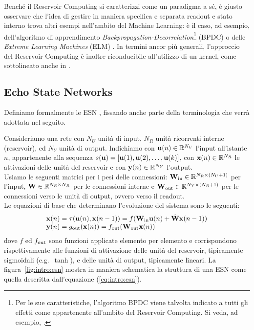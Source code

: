 Benché il Reservoir Computing si caratterizzi come un paradigma a sé, è giusto osservare che l'idea di gestire in maniera specifica e separata readout e stato interno trova altri esempi nell'ambito del Machine Learning: è il caso, ad esempio, dell'algoritmo di apprendimento \emph{Backpropagation-Decorrelation}\footnote{Per le sue caratteristiche, l'algoritmo BPDC viene talvolta indicato a tutti gli effetti come appartenente all'ambito del Reservoir Computing. Si veda, ad esempio, \cite{Song:Effects}.} (BPDC) \cite{Steil:BPDC} o delle \emph{Extreme Learning Machines} (ELM) \cite{Huang:ELM}. In termini ancor più generali, l'approccio del Reservoir Computing è inoltre riconducibile all'utilizzo di un kernel, come sottolineato anche in \cite{Jaeger:SpecialIssue}. 


\subsection{Echo State Networks}\label{sec:intro:rc:esn}
Definiamo formalmente le ESN \cite{Jaeger:EchoStateApproach, Jaeger:ShortTermMemory, Jaeger:HarnessingNonlinearity}, fissando anche parte della terminologia che verrà adottata nel seguito.

Consideriamo una rete con $N_U$ unità di input, $N_R$ unità ricorrenti interne (reservoir), ed $N_Y$ unità di output. 
Indichiamo con $\mathbf{u}(n) \in \mathbb{R}^{N_U}$ l'input all'istante $n$, appartenente alla sequenza $s(\mathbf{u}) = [\mathbf{u}(1), \mathbf{u}(2), \dots, \mathbf{u}(k)]$, con $\mathbf{x}(n) \in \mathbb{R}^{N_R}$ le attivazioni delle unità del reservoir e con $\mathbf{y}(n) \in \mathbb{R}^{N_Y}$ l'output.\\
Usiamo le seguenti matrici per i pesi delle connessioni: $\matr{W}_\textup{in} \in \R^{N_R \times (N_U+1)}$ per l'input, $\matr{W} \in \R^{N_R \times N_R}$ per le connessioni interne e $\matr{W}_\textup{out} \in \R^{N_Y \times (N_R+1)}$ per le connessioni verso le unità di output, ovvero verso il readout.\\
Le equazioni di base che determinano l'evoluzione del sistema sono le seguenti:
\begin{equation}\label{eq:intro:esn}
\begin{array}{l}
\vect{x}(n) = \tau( \vect{u}(n), \vect{x}(n-1) ) = f( \matr{W}_{\textup{in}} \vect{u}(n) + \hat{\matr{W}} \vect{x}(n-1) ) \\
\vect{y}(n) = g_\textup{out}( \vect{x}(n) ) = f_{\textup{out}}( \matr{W}_{\textup{out}} \vect{x}(n) )
\end{array}
\end{equation}
dove $f$ ed $f_{\textup{out}}$ sono funzioni applicate elemento per elemento e corrispondono rispettivamente alle funzioni di attivazione delle unità del reservoir, tipicamente sigmoidali (e.g.\ $\tanh$), e delle unità di output, tipicamente lineari.
La figura~\ref{fig:intro:esn} mostra in maniera schematica la struttura di una ESN come quella descritta dall'equazione (\ref{eq:intro:esn}).

